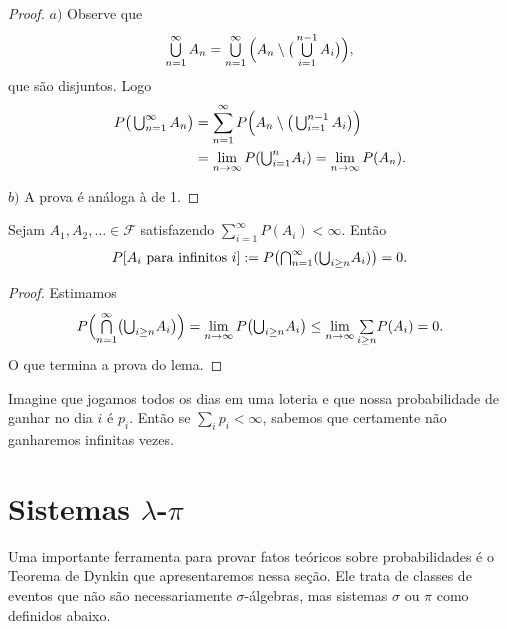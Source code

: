 \documentclass[../main/Notas_de_aula.tex]{subfiles}
\begin{document}
\begin{proof}
  $a)$ Observe que
  \begin{equation}
    \operatorname*{{\textstyle \bigcup}}_{n = 1}^\infty A_n = \operatorname*{{\textstyle \bigcup}}_{n = 1}^\infty \Big( A_n \setminus \big( \operatorname*{{\textstyle \bigcup}}_{i=1}^{n-1} A_i \big) \Big),
  \end{equation}
  que são disjuntos.
  Logo
  \begin{equation}
    \begin{split}
      P\big(\operatorname*{{\textstyle \bigcup}}\nolimits_{n = 1}^\infty A_n\big) & = \sum_{n = 1}^\infty P\Big( A_n \setminus \big(\operatorname*{{\textstyle \bigcup}}\nolimits_{i=1}^{n-1} A_i \big) \Big)\\
      & = \lim_{n\to \infty} P({\operatorname*{{\textstyle \bigcup}}\nolimits_{i = 1}^n} A_i) = \lim_{n\to \infty} P(A_n).
    \end{split}
  \end{equation}

  $b)$ A prova é análoga à de 1.
\end{proof}

\begin{lemma}
  Sejam $A_1, A_2, \dots \in \mathcal{F}$ satisfazendo $\sum_{i = 1}^\infty P(A_i) < \infty$.
  Então
  \begin{equation}
    P[\text{$A_i$ para infinitos $i$}] := P\big({\operatorname*{{\textstyle \bigcap}}\nolimits_{n = 1}^\infty} ({\operatorname*{{\textstyle \bigcup}}\nolimits_{i \geq n}} A_i)\big) = 0.
  \end{equation}
\end{lemma}

\begin{proof}
  Estimamos
  \begin{equation}
    P \Big( {\operatorname*{{\textstyle \bigcap}}_{n = 1}^\infty} \big({\operatorname*{{\textstyle \bigcup}}\nolimits_{i \geq n}} A_i \big) \Big) = \lim_{n\to \infty} P \big( {\operatorname*{{\textstyle \bigcup}}\nolimits_{i \geq n}} A_i \big) \leq \lim_{n\to \infty} {\textstyle\sum\limits_{i \geq n}} P(A_i) = 0.
  \end{equation}
  O que termina a prova do lema.
\end{proof}

Imagine que jogamos todos os dias em uma loteria e que nossa probabilidade de ganhar no dia $i$ é $p_i$.
Então se $\sum_i p_i < \infty$, sabemos que certamente não ganharemos infinitas vezes.

\section{Sistemas \texorpdfstring{$\lambda$-$\pi$}{lambda-pi}}

Uma importante ferramenta para provar fatos teóricos sobre probabilidades é o Teorema de Dynkin que apresentaremos nessa seção.
Ele trata de classes de eventos que não são necessariamente $\sigma$-álgebras, mas sistemas $\sigma$ ou $\pi$ como definidos abaixo.
\end{document}
